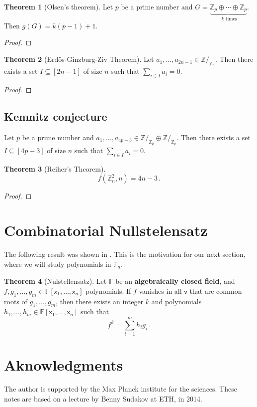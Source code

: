 \documentclass[12pt]{amsart}
\theoremstyle{definition}
\newtheorem{thm}{Theorem}[section]
\newcommand{\Z}{\mathbb{Z}}
\newcommand{\F}{\mathbb{F}}
\newcommand{\vv}{\mathsf{v}}
\newcommand{\vx}{\mathsf{x}}
\begin{document}
\begin{thm}[Olsen's theorem]
Let $p$ be a prime number and $G = \underbrace{\Z_p \oplus \cdots \oplus \Z_p}_{\text{ $k$ times } }$.
Then $g(G) = k(p-1)+ 1$.
\end{thm}

\begin{proof}

\end{proof}


\begin{thm}[Erd\"os-Ginzburg-Ziv Theorem]
Let $a_1, \ldots, a_{2n-1} \in \Z/_{\Z_n} $.
Then there exists a set $I\subseteq [2n-1] $ of size $n$ such that $\sum_{i\in I} a_i = 0$.
\end{thm}

\begin{proof}

\end{proof}

\subsection{Kemnitz conjecture}

Let $p$ be a prime number and  $a_1, \ldots, a_{4p-3} \in \Z/_{\Z_p}\oplus \Z/_{\Z_p} $.
Then there exists a set $I\subseteq [4p-3] $ of size $n$ such that $\sum_{i\in I} a_i = 0$.


\begin{thm}[Reiher's Theorem]
$$f(\Z_n^2, n ) = 4n - 3 \, . $$
\end{thm}



\begin{proof}

\end{proof}


\section{Combinatorial Nullstelensatz}


The following result was shown in \cite{hilbert1893ueber}.
This is the motivation for our next section, where we will study polynomials in $\F_q$.

\begin{thm}[Nulstellensatz]
Let $\F$ be an \textbf{algebraically closed field}, and $f, g_1, \ldots, g_m\in \F[\vx_1, \ldots, \vx_n]$ polynomials.
If $f$ vanishes in all $\vv$ that are common roots of $g_1, \ldots, g_m$, then there exists an integer $k$ and polynomials $h_1, \ldots, h_m \in \F[\vx_1, \ldots, \vx_n]$ such that
$$ f^k = \sum_{i=1}^m h_i g_i \, . $$
\end{thm}




\section*{Aknowledgments}
The author is supported by the Max Planck institute for the sciences. 
These notes are based on a lecture by Benny Sudakov at ETH, in 2014.



\end{document}
